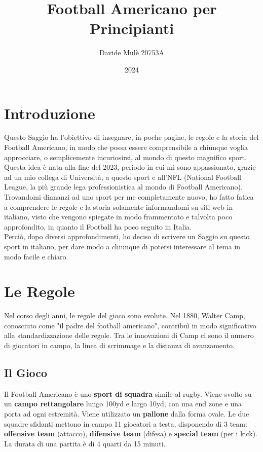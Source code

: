 \documentclass[a4paper, 12pt, oneside]{book}
\begin{document}
	
	\frontmatter
	
	\title{\huge \textbf{Football Americano per Principianti}}
	\author{\huge Davide Mulè 20753A}
	\date{2024}
	\maketitle
	
	\tableofcontents
	
	\chapter{Introduzione}
	Questo Saggio ha l'obiettivo di insegnare, in poche pagine, le regole e la storia del Football Americano, in modo che possa essere comprensibile a chiunque voglia approcciare, o semplicemente incuriosirsi, al mondo di questo magnifico sport.
	\\Questa idea è nata alla fine del 2023, periodo in cui mi sono appassionato,  grazie ad un mio collega di Università, a questo sport e all'NFL (National Football League, la più grande lega professionistica al mondo di Football Americano). Trovandomi dinnanzi ad uno sport per me completamente nuovo, ho fatto fatica a comprendere le regole e la storia solamente informandomi su siti web in italiano, visto che vengono spiegate in modo frammentato e talvolta poco approfondito, in quanto il Football ha poco seguito in Italia.
	\\Perciò, dopo diversi approfondimenti, ho deciso di scrivere un Saggio su questo sport in italiano, per dare modo a chiunque di potersi interessare al tema in modo facile e chiaro.
	
	\mainmatter

	\chapter{Le Regole}
	Nel corso degli anni, le regole del gioco sono evolute. Nel 1880, Walter Camp, conosciuto come "il padre del football americano", contribuì in modo significativo alla standardizzazione delle regole. Tra le innovazioni di Camp ci sono il numero di giocatori in campo, la linea di scrimmage e la distanza di avanzamento.
	
	\section{Il Gioco}
	Il Football Americano è uno \textbf{sport di squadra} simile al rugby. Viene svolto su un \textbf{campo rettangolare} lungo 100yd e largo 10yd, con una end zone e una porta ad ogni estremità. Viene utilizzato un \textbf{pallone} dalla forma ovale.
	Le due squadre sfidanti mettono in campo 11 giocatori a testa, disponendo di 3 team: \textbf{offensive team} (attacco), \textbf{difensive team} (difesa) e \textbf{special team} (per i kick).
	La durata di una partita è di 4 quarti da 15 minuti.
	
\end{document}
